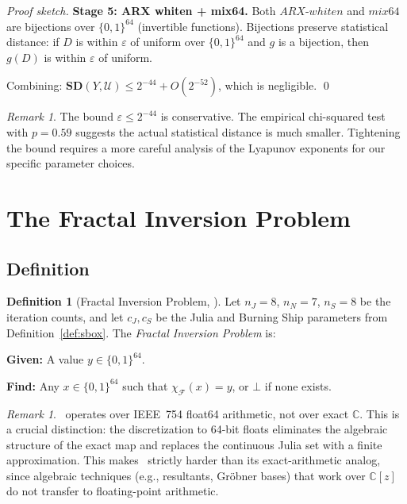 \documentclass[11pt]{article}
\theoremstyle{definition}
\newtheorem{definition}[theorem]{Definition}
\theoremstyle{remark}
\newtheorem{remark}[theorem]{Remark}
\newcommand{\sbox}{\chi_{\mathcal{F}}} %
\newcommand{\bits}{\{0,1\}}
\newcommand{\SD}{\mathbf{SD}}         %
\newcommand{\FIP}{\mathsf{FIP}}       %
\begin{document}
\begin{proof}[Proof sketch]
\textbf{Stage 5: ARX whiten + mix64.} Both $\mathit{ARX\text{-}whiten}$ and
$\mathit{mix64}$ are bijections over $\bits^{64}$ (invertible functions).
Bijections preserve statistical distance: if $D$ is within $\varepsilon$ of
uniform over $\bits^{64}$ and $g$ is a bijection, then $g(D)$ is within
$\varepsilon$ of uniform.

Combining: $\SD(Y, \mathcal{U}) \leq 2^{-44} + O(2^{-52})$, which is negligible.
\qed
\end{proof}

\begin{remark}
The bound $\varepsilon \leq 2^{-44}$ is conservative. The empirical chi-squared
test with $p = 0.59$ suggests the actual statistical distance is much smaller.
Tightening the bound requires a more careful analysis of the Lyapunov exponents
for our specific parameter choices.
\end{remark}

\section{The Fractal Inversion Problem}
\label{sec:fip}

\subsection{Definition}

\begin{definition}[Fractal Inversion Problem, \FIP]
\label{def:fip}
Let $n_J = 8$, $n_N = 7$, $n_S = 8$ be the iteration counts, and let
$c_J, c_S$ be the Julia and Burning Ship parameters from Definition~\ref{def:sbox}.
The \emph{Fractal Inversion Problem} is:

\medskip
\noindent\textbf{Given:} A value $y \in \bits^{64}$.

\noindent\textbf{Find:} Any $x \in \bits^{64}$ such that $\sbox(x) = y$,
or $\bot$ if none exists.
\end{definition}

\begin{remark}
\FIP\ operates over IEEE~754 float64 arithmetic, not over exact $\mathbb{C}$.
This is a crucial distinction: the discretization to 64-bit floats eliminates
the algebraic structure of the exact map and replaces the continuous Julia
set with a finite approximation. This makes \FIP\ strictly harder than its
exact-arithmetic analog, since algebraic techniques (e.g., resultants, Gr\"obner
bases) that work over $\mathbb{C}[z]$ do not transfer to floating-point
arithmetic.
\end{remark}
\end{document}
